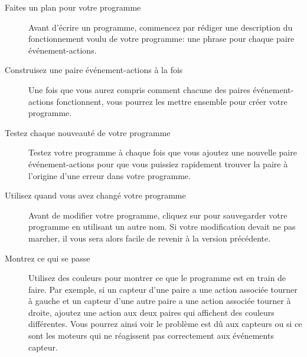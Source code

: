\begin{description}

\item[Faites un plan pour votre programme]
Avant d'écrire un programme,
commencez par rédiger une description du fonctionnement voulu de votre programme:
une phrase pour chaque paire événement-actions.

\item[Construisez une paire événement-actions à la fois]
Une fois que vous aurez compris comment chacune des paires événement-actions fonctionnent,
vous pourrez les mettre ensemble pour créer votre programme.

\item[Testez chaque nouveauté de votre programme]
Testez votre programme à chaque fois que vous ajoutez une nouvelle paire événement-actions
pour que vous puissiez rapidement trouver la paire à l'origine d'une erreur dans votre programme.

\item[Utilisez  quand vous avez changé votre programme]
Avant de modifier votre programme, cliquez sur  pour sauvegarder votre programme
en utilisant un autre nom. Si votre modification devait ne pas marcher,
il vous sera alors facile de revenir à la version précédente.

\item[Montrez ce qui se passe]
Utilisez des couleurs pour montrer ce que le programme est en train de faire.
Par exemple, si un capteur d'une paire a une action associée tourner à gauche
et un capteur d'une autre paire a une action associée tourner à droite,
ajoutez une action aux deux paires qui affichent des couleurs différentes.
Vous pourrez ainsi voir le problème est dû aux capteurs ou si ce sont les moteurs
qui ne réagissent pas correctement aux événements capteur.

\end{description}



